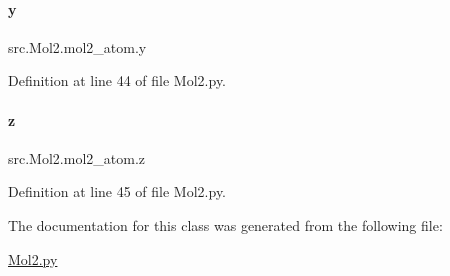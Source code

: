 \paragraph{\texorpdfstring{y}{y}}
{\footnotesize\ttfamily src.\+Mol2.\+mol2\+\_\+atom.\+y}



Definition at line 44 of file Mol2.\+py.

\mbox{\label{classsrc_1_1Mol2_1_1mol2__atom_ad7bd1ddebc525163f12de1e11b51bf02}} 
\paragraph{\texorpdfstring{z}{z}}
{\footnotesize\ttfamily src.\+Mol2.\+mol2\+\_\+atom.\+z}



Definition at line 45 of file Mol2.\+py.



The documentation for this class was generated from the following file\+:\begin{DoxyCompactItemize}
\item 
\hyperlink{Mol2_8py}{Mol2.\+py}\end{DoxyCompactItemize}
